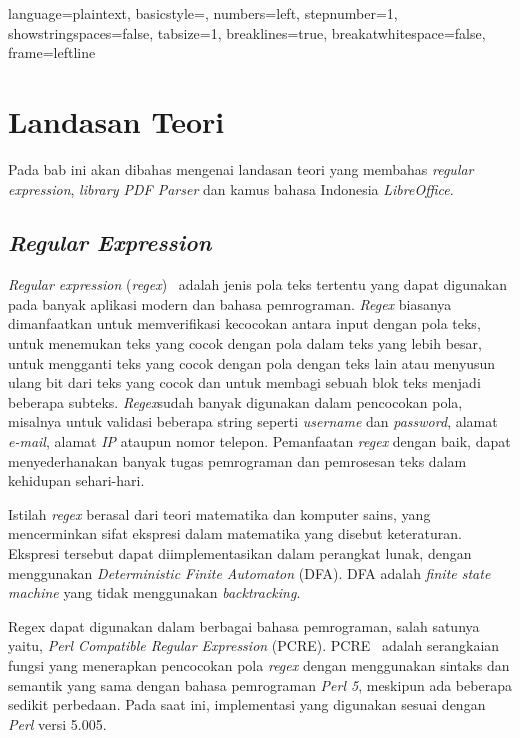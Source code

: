 
\lstset
{ 
    language=plaintext,
    basicstyle=\footnotesize,
    numbers=left,
    stepnumber=1,
    showstringspaces=false,
    tabsize=1,
    breaklines=true,
    breakatwhitespace=false,
    frame=leftline
}

\chapter{Landasan Teori}
\label{chap:teori}

Pada bab ini akan dibahas mengenai landasan teori yang membahas \textit{regular expression}, \textit{library PDF Parser} dan kamus bahasa Indonesia \textit{LibreOffice}.

\section{\textit{Regular Expression}}
\label{sec:regex} 
 
\textit{Regular expression} (\textit{regex})~\cite{jan:12:cookbook} adalah jenis pola teks tertentu yang dapat digunakan pada banyak aplikasi modern dan bahasa pemrograman. \textit{Regex} biasanya dimanfaatkan untuk memverifikasi kecocokan antara input dengan pola teks, untuk menemukan teks yang cocok dengan pola dalam teks yang lebih besar, untuk mengganti teks yang cocok dengan pola dengan teks lain atau menyusun ulang bit dari teks yang cocok dan untuk membagi sebuah blok teks menjadi beberapa subteks. \textit{Regex}sudah banyak digunakan dalam pencocokan pola, misalnya untuk validasi beberapa string seperti \textit{username} dan \textit{password}, alamat \textit{e-mail}, alamat \textit{IP} ataupun nomor telepon. Pemanfaatan \textit{regex} dengan baik, dapat menyederhanakan banyak tugas pemrograman dan pemrosesan teks dalam kehidupan sehari-hari.

Istilah \textit{regex} berasal dari teori matematika dan komputer sains, yang mencerminkan sifat ekspresi dalam matematika yang disebut keteraturan. Ekspresi tersebut dapat diimplementasikan dalam perangkat lunak, dengan menggunakan \textit{Deterministic Finite Automaton} (DFA). DFA adalah \textit{finite state machine} yang tidak menggunakan \textit{backtracking}.

Regex dapat digunakan dalam berbagai bahasa pemrograman, salah satunya yaitu, \textit{Perl Compatible Regular Expression} (PCRE). PCRE~\cite{pcre} adalah serangkaian fungsi yang menerapkan pencocokan pola \textit{regex} dengan menggunakan sintaks dan semantik yang sama dengan bahasa pemrograman \textit{Perl 5}, meskipun ada beberapa sedikit perbedaan. Pada saat ini, implementasi yang digunakan sesuai dengan \textit{Perl} versi 5.005.

